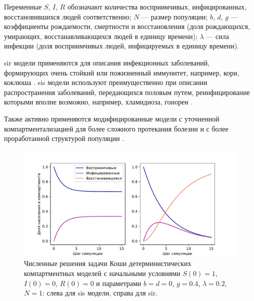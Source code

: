 \documentclass[a4paper,12pt]{article} %
\begin{document}
Переменные $S$, $I$, $R$ обозначают количества восприимчивых, инфицированных, восстановившихся людей соответственно; $N$ --- размер популяции; $b$, $d$, $g$ --- коэффициенты рождаемости, смертности и восстановления (доля рождающихся, умирающих, восстанавливающихся людей в единицу времени); $\lambda$ --- сила инфекции (доля восприимчивых людей, инфицируемых в единицу времени).

\gls{sir} модели применяются для описания инфекционных заболеваний, формирующих очень стойкий или пожизненный иммунитет, например, кори, коклюша \cite{keeling2005networks,kermack1927contribution,anderson1992may,grenfell1992chance,rohani2000impact}. \gls{sis} модели используют преимущественно при описании распространения заболеваний, передающихся половым путем, реинфицирование которыми вполне возможно, например, хламидиоза, гонореи \cite{keeling2005networks,hethcote1984springer,garnett1996sexually}.

Также активно применяются модифицированные модели с уточненной компартментализацией для более сложного протекания болезни \cite{keeling2005networks, anderson1988epidemiology, grenfell2001travelling} и с более проработанной структурой популяции \cite{hethcote1984springer, ghani1997role, keeling1997modelling}.



\begin{figure}[]
    \centering
    \includegraphics[width=\linewidth]{images/compartment.pdf}
    \caption{Численные решения задачи Коши детерминистических компартментных моделей с начальными условиями $S(0)=1$, $I(0)=0$, $R(0)=0$ и параметрами $b=d=0$, $g=0.4$, $\lambda=0.2$, $N=1$: слева для \gls{sis} модели, справа для \gls{sir}.}
\end{figure}
\end{document}
